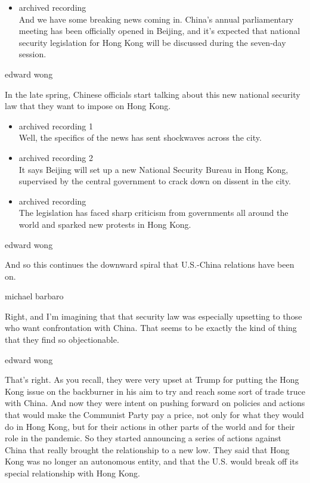 \begin{itemize}
\tightlist
\item
  archived recording\\
  And we have some breaking news coming in. China's annual parliamentary
  meeting has been officially opened in Beijing, and it's expected that
  national security legislation for Hong Kong will be discussed during
  the seven-day session.
\end{itemize}

edward wong

In the late spring, Chinese officials start talking about this new
national security law that they want to impose on Hong Kong.

\begin{itemize}
\item
  archived recording 1\\
  Well, the specifics of the news has sent shockwaves across the city.
\item
  archived recording 2\\
  It says Beijing will set up a new National Security Bureau in Hong
  Kong, supervised by the central government to crack down on dissent in
  the city.
\item
  archived recording\\
  The legislation has faced sharp criticism from governments all around
  the world and sparked new protests in Hong Kong.
\end{itemize}

edward wong

And so this continues the downward spiral that U.S.-China relations have
been on.

michael barbaro

Right, and I'm imagining that that security law was especially upsetting
to those who want confrontation with China. That seems to be exactly the
kind of thing that they find so objectionable.

edward wong

That's right. As you recall, they were very upset at Trump for putting
the Hong Kong issue on the backburner in his aim to try and reach some
sort of trade truce with China. And now they were intent on pushing
forward on policies and actions that would make the Communist Party pay
a price, not only for what they would do in Hong Kong, but for their
actions in other parts of the world and for their role in the pandemic.
So they started announcing a series of actions against China that really
brought the relationship to a new low. They said that Hong Kong was no
longer an autonomous entity, and that the U.S. would break off its
special relationship with Hong Kong.


